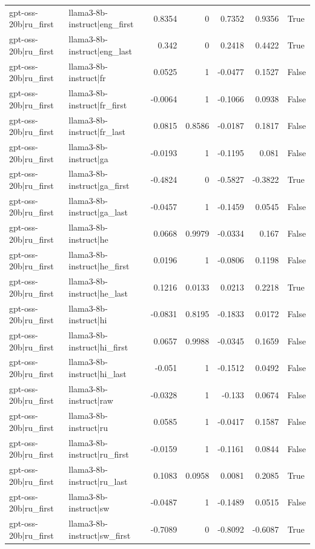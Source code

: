 \begin{table}
\begin{tabular}{l l r r r r l}
gpt-oss-20b|ru_first & llama3-8b-instruct|eng_first & 0.8354 & 0 & 0.7352 & 0.9356 & True \\
gpt-oss-20b|ru_first & llama3-8b-instruct|eng_last & 0.342 & 0 & 0.2418 & 0.4422 & True \\
gpt-oss-20b|ru_first & llama3-8b-instruct|fr & 0.0525 & 1 & -0.0477 & 0.1527 & False \\
gpt-oss-20b|ru_first & llama3-8b-instruct|fr_first & -0.0064 & 1 & -0.1066 & 0.0938 & False \\
gpt-oss-20b|ru_first & llama3-8b-instruct|fr_last & 0.0815 & 0.8586 & -0.0187 & 0.1817 & False \\
gpt-oss-20b|ru_first & llama3-8b-instruct|ga & -0.0193 & 1 & -0.1195 & 0.081 & False \\
gpt-oss-20b|ru_first & llama3-8b-instruct|ga_first & -0.4824 & 0 & -0.5827 & -0.3822 & True \\
gpt-oss-20b|ru_first & llama3-8b-instruct|ga_last & -0.0457 & 1 & -0.1459 & 0.0545 & False \\
gpt-oss-20b|ru_first & llama3-8b-instruct|he & 0.0668 & 0.9979 & -0.0334 & 0.167 & False \\
gpt-oss-20b|ru_first & llama3-8b-instruct|he_first & 0.0196 & 1 & -0.0806 & 0.1198 & False \\
gpt-oss-20b|ru_first & llama3-8b-instruct|he_last & 0.1216 & 0.0133 & 0.0213 & 0.2218 & True \\
gpt-oss-20b|ru_first & llama3-8b-instruct|hi & -0.0831 & 0.8195 & -0.1833 & 0.0172 & False \\
gpt-oss-20b|ru_first & llama3-8b-instruct|hi_first & 0.0657 & 0.9988 & -0.0345 & 0.1659 & False \\
gpt-oss-20b|ru_first & llama3-8b-instruct|hi_last & -0.051 & 1 & -0.1512 & 0.0492 & False \\
gpt-oss-20b|ru_first & llama3-8b-instruct|raw & -0.0328 & 1 & -0.133 & 0.0674 & False \\
gpt-oss-20b|ru_first & llama3-8b-instruct|ru & 0.0585 & 1 & -0.0417 & 0.1587 & False \\
gpt-oss-20b|ru_first & llama3-8b-instruct|ru_first & -0.0159 & 1 & -0.1161 & 0.0844 & False \\
gpt-oss-20b|ru_first & llama3-8b-instruct|ru_last & 0.1083 & 0.0958 & 0.0081 & 0.2085 & True \\
gpt-oss-20b|ru_first & llama3-8b-instruct|sw & -0.0487 & 1 & -0.1489 & 0.0515 & False \\
gpt-oss-20b|ru_first & llama3-8b-instruct|sw_first & -0.7089 & 0 & -0.8092 & -0.6087 & True \\

\end{tabular}
\end{table}
